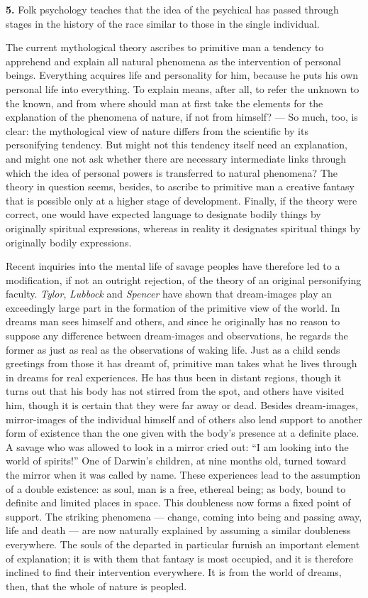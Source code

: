 \documentclass[12pt,a4paper]{book}
\newcommand{\opage}[1]{\marginnote{\footnotesize\textit{[#1]}}}
\begin{document}
\textbf{5.} Folk psychology teaches that the idea of the psychical has
passed through stages in the history of the race similar to those in the
single individual.

The current mythological theory ascribes to primitive man a tendency to
apprehend and explain all natural phenomena as the intervention of
personal beings. Everything acquires life and personality for him,
because he puts his own personal life into everything. To explain means,
after all, to refer the unknown to the known, and from where should man
at
\opage{8}first take the elements for the explanation of the phenomena of
nature, if not from himself? --- So much, too, is clear: the
mythological view of nature differs from the scientific by its
personifying tendency. But might not this tendency itself need an
explanation, and might one not ask whether there are necessary
intermediate links through which the idea of personal powers is
transferred to natural phenomena? The theory in question seems,
besides, to ascribe to primitive man a creative fantasy that is possible
only at a higher stage of development. Finally, if the theory were
correct, one would have expected language to designate bodily things by
originally spiritual expressions, whereas in reality it designates
spiritual things by originally bodily expressions.

Recent inquiries into the mental life of savage peoples have therefore
led to a modification, if not an outright rejection, of the theory of an
original personifying faculty. \emph{Tylor}, \emph{Lubbock} and
\emph{Spencer} have shown that dream-images play an exceedingly large
part in the formation of the primitive view of the world. In dreams man
sees himself and others, and since he originally has no reason to
suppose any difference between dream-images and observations, he
regards the former as just as real as the observations of waking life.
Just as a child sends greetings from those it has dreamt of, primitive
man takes what he lives through in dreams for real experiences. He has
thus been in distant regions, though it turns out that his body has not
stirred from the spot, and others have visited him, though it is certain
that they were far away or dead. Besides dream-images, mirror-images of
the individual himself and of others also lend support to another form
of existence than the one given with the body's presence at a definite
place. A savage who was allowed to look in a mirror cried out: ``I am
looking into the world of spirits!'' One of Darwin's children, at nine
months old, turned toward the mirror when it was called by name. These
experiences lead to the assumption of a double existence: as soul, man
is a free, ethereal being; as body, bound to definite and limited places
in space. This doubleness now forms a fixed point of support. The
striking phenomena --- change, coming into being and passing away, life
and death --- are now naturally explained
\opage{9}by assuming a similar doubleness everywhere. The souls of the
departed in particular furnish an important element of explanation; it
is with them that fantasy is most occupied, and it is therefore inclined
to find their intervention everywhere. It is from the world of dreams,
then, that the whole of nature is peopled.
\end{document}
